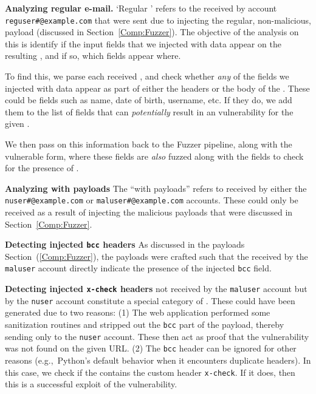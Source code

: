 \noindent\textbf{Analyzing regular e-mail.}
\sloppy
`Regular \email' refers to the \emails received by account {\lstinline{reguser#@example.com}} that were sent due to injecting the regular, non-malicious, payload (discussed in Section~\ref{Comp:Fuzzer}). The objective of the analysis on this \email is identify if the input fields that we injected with data appear on the resulting \email, and if so, which fields appear where.

To find this, we parse each received \email, and check whether \emph{any} of the fields we injected with data appear as part of either the headers or the body of the \email. These could be fields such as name, date of birth, username, etc. If they do, we add them to the list of fields that can \emph{potentially} result in an \ehi vulnerability for the given \email. 

We then pass on this information back to the Fuzzer pipeline, along with the vulnerable form, where these fields are \emph{also} fuzzed along with the \email fields to check for the presence of \ehi.

\noindent\textbf{Analyzing \email with payloads}
The ``\emails with payloads'' refers to \emails received by either the {\lstinline{nuser#@example.com}} or {\lstinline{maluser#@example.com}} accounts. These \emails could only be received as a result of injecting the malicious payloads that were discussed in Section~\ref{Comp:Fuzzer}. 

\noindent\textbf{Detecting injected \texttt{bcc} headers}
As discussed in the payloads Section~(\ref{Comp:Fuzzer}), the payloads were crafted such that the \emails received by the \texttt{maluser} account directly indicate the presence of the injected \texttt{bcc} field. 

\label{analyze:detect_x_check}
\noindent\textbf{Detecting injected \texttt{x-check} headers} \Emails
not received by the \texttt{maluser} account but by the \texttt{nuser}
account constitute a special category of \emails. These \emails could
have been generated due to two reasons: (1) The web application
performed some sanitization routines and stripped out the \texttt{bcc}
part of the payload, thereby sending \emails only to the
\texttt{nuser} account. These \emails then act as proof that the
vulnerability was not found on the given URL. (2) The \texttt{bcc}
header can be ignored for other reasons (e.g.,\ Python's default
behavior when it encounters duplicate headers). In this case, we check
if the \email contains the custom header \texttt{x-check}. If it does,
then this is a successful exploit of the vulnerability.
